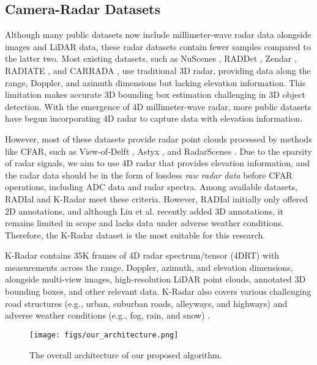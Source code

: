 \subsection{Camera-Radar Datasets}
Although many public datasets now include millimeter-wave radar data alongside images and LiDAR data, 
these radar datasets contain fewer samples compared to the latter two. 
Most existing datasets, such as NuScenes \cite{nuscenes}, RADDet \cite{RADDet}, Zendar \cite{zendar}, RADIATE \cite{RADIATE}, and CARRADA \cite{CARRADADC}, 
use traditional 3D radar, 
providing data along the range, Doppler, and azimuth dimensions but lacking elevation information. 
This limitation makes accurate 3D bounding box estimation challenging in 3D object detection.
With the emergence of 4D millimeter-wave radar, 
more public datasets have begun incorporating 4D radar to capture data with elevation information. 

However, most of these datasets provide radar point clouds processed by methods like CFAR, 
such as View-of-Delft \cite{vod}, Astyx \cite{astyx}, and RadarScenes \cite{radar_scenes}. 
Due to the sparsity of radar signals, we aim to use 4D radar that provides elevation information, 
and the radar data should be in the form of lossless \textit{raw radar data} before CFAR operations, 
including ADC data and radar spectra. 
Among available datasets, RADIal and K-Radar meet these criteria. 
However, RADIal initially only offered 2D annotations, 
and although Liu et al. \cite{echofusion} recently added 3D annotations, 
it remains limited in scope and lacks data under adverse weather conditions. 
Therefore, the K-Radar dataset is the most suitable for this research.

K-Radar contains 35K frames of 4D radar spectrum/tensor (4DRT) with measurements across 
the range, Doppler, azimuth, and elevation dimensions, 
alongside multi-view images, high-resolution LiDAR point clouds, annotated 3D bounding boxes, and other relevant data. 
K-Radar also covers various challenging road structures (e.g., urban, suburban roads, alleyways, and highways) 
and adverse weather conditions (e.g., fog, rain, and snow) \cite{k-radar}.


\begin{figure*}[ht]
	\centerline{
		\texttt{[image: figs/our\_architecture.png]}
	}
	\caption{The overall architecture of our proposed algorithm.}
	\label{our_arch}
\end{figure*}

